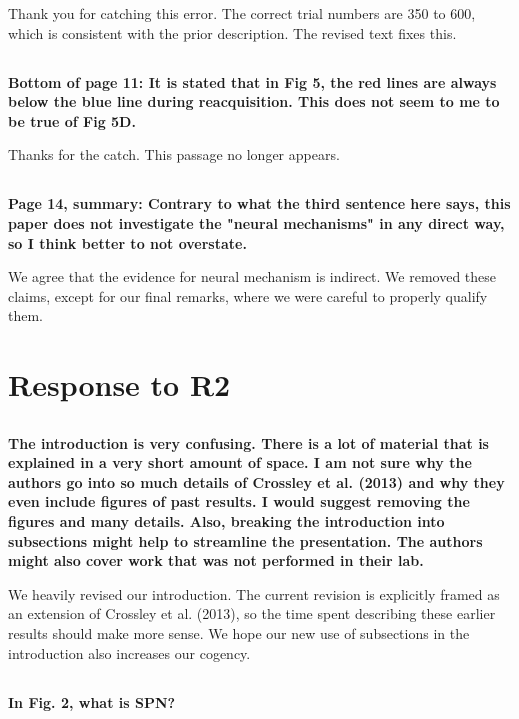 \documentclass[10pt,a4paper]{article} \usepackage{amsmath} \usepackage{parskip}
\begin{document}
Thank you for catching this error. The correct trial numbers are 350 to 600,
which is consistent with the prior description. The revised text fixes this.

\subsection{} \textbf{
  Bottom of page 11: It is stated that in Fig 5, the red lines are always below
  the blue line during reacquisition. This does not seem to me to be true of Fig
  5D.
}

Thanks for the catch. This passage no longer appears.

\subsection{} \textbf{
  Page 14, summary: Contrary to what the third sentence here says, this paper does
  not investigate the "neural mechanisms" in any direct way, so I think better to
  not overstate.
}

We agree that the evidence for neural mechanism is indirect. We removed these
claims, except for our final remarks, where we were careful to properly qualify
them.

\section{Response to R2}

\subsection{} \textbf{
  The introduction is very confusing. There is a lot of material that is explained
  in a very short amount of space. I am not sure why the authors go into so much
  details of Crossley et al. (2013) and why they even include figures of past
  results. I would suggest removing the figures and many details. Also, breaking
  the introduction into subsections might help to streamline the presentation. The
  authors might also cover work that was not performed in their lab.
}

We heavily revised our introduction. The current revision is explicitly framed
as an extension of Crossley et al. (2013), so the time spent describing these
earlier results should make more sense. We hope our new use of subsections in
the introduction also increases our cogency.

\subsection{} \textbf{
  In Fig. 2, what is SPN?
}
\end{document}
